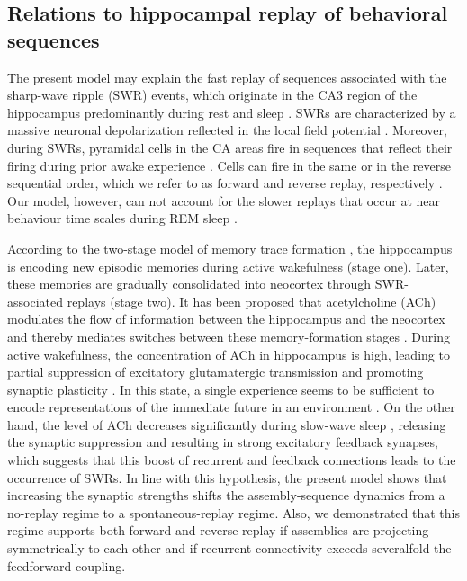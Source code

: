   \subsection{Relations to hippocampal replay of behavioral sequences}
    The present model may explain the fast replay of sequences associated with
    the sharp-wave ripple (SWR) events, which originate in the CA3 region of
    the hippocampus predominantly during rest and sleep \citep{Buzsaki1989}.
    SWRs are characterized by a massive neuronal depolarization reflected in
    the local field potential \citep{Csicsvari2000}. Moreover, during SWRs,
    pyramidal cells in the CA areas fire in sequences that reflect their firing
    during prior awake experience \citep{Lee2002}. Cells can fire in the same or
    in the reverse sequential order, which we refer to as forward and reverse
    replay, respectively \citep{Foster2006, Diba2007}. Our model, however, can
    not account for the slower replays that occur at near behaviour time scales
    during REM sleep \citep{Louie2001}.

    According to the two-stage model of memory trace formation
    \citep{Buzsaki1989}, the hippocampus is encoding new episodic memories
    during active wakefulness (stage one). Later, these memories are gradually
    consolidated into neocortex through SWR-associated replays (stage two). It
    has been proposed that acetylcholine (ACh) modulates the flow of
    information between the hippocampus and the neocortex and thereby mediates
    switches between these memory-formation stages \citep{Hasselmo1999}. During
    active wakefulness, the concentration of ACh in hippocampus is high,
    leading to partial suppression of excitatory glutamatergic transmission
    \citep{Hasselmo1995} and promoting synaptic plasticity \citep{Halff2014}. In
    this state, a single experience seems to be sufficient to encode
    representations of the immediate future in an environment \citep{Feng2015}.
    On the other hand, the level of ACh decreases significantly during
    slow-wave sleep \citep{Marrosu1995}, releasing the synaptic suppression and
    resulting in strong excitatory feedback synapses, which suggests that this
    boost of recurrent and feedback connections leads to the occurrence of
    SWRs. In line with this hypothesis, the present model shows that increasing
    the synaptic strengths shifts the assembly-sequence dynamics from a
    no-replay regime to a spontaneous-replay regime. Also, we demonstrated that
    this regime supports both forward and reverse replay if assemblies are
    projecting symmetrically to each other and if recurrent connectivity
    exceeds severalfold the feedforward coupling.
    
